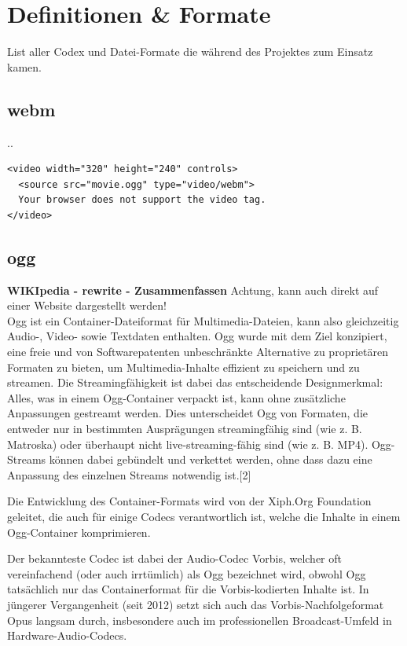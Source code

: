 \section{Definitionen \& Formate}
List aller Codex und Datei-Formate die während des Projektes zum Einsatz kamen.

\subsection{webm}
..

\begin{verbatim}
<video width="320" height="240" controls>
  <source src="movie.ogg" type="video/webm">
  Your browser does not support the video tag.
</video> 
\end{verbatim}

\subsection{ogg}

\textbf{WIKIpedia - rewrite - Zusammenfassen}
Achtung, kann auch direkt auf einer Website dargestellt werden!\\

Ogg ist ein Container-Dateiformat für Multimedia-Dateien, kann also gleichzeitig Audio-, Video- sowie Textdaten enthalten. Ogg wurde mit dem Ziel konzipiert, eine freie und von Softwarepatenten unbeschränkte Alternative zu proprietären Formaten zu bieten, um Multimedia-Inhalte effizient zu speichern und zu streamen. Die Streamingfähigkeit ist dabei das entscheidende Designmerkmal: Alles, was in einem Ogg-Container verpackt ist, kann ohne zusätzliche Anpassungen gestreamt werden. Dies unterscheidet Ogg von Formaten, die entweder nur in bestimmten Ausprägungen streamingfähig sind (wie z. B. Matroska) oder überhaupt nicht live-streaming-fähig sind (wie z. B. MP4). Ogg-Streams können dabei gebündelt und verkettet werden, ohne dass dazu eine Anpassung des einzelnen Streams notwendig ist.[2]

Die Entwicklung des Container-Formats wird von der Xiph.Org Foundation geleitet, die auch für einige Codecs verantwortlich ist, welche die Inhalte in einem Ogg-Container komprimieren.

Der bekannteste Codec ist dabei der Audio-Codec Vorbis, welcher oft vereinfachend (oder auch irrtümlich) als Ogg bezeichnet wird, obwohl Ogg tatsächlich nur das Containerformat für die Vorbis-kodierten Inhalte ist. In jüngerer Vergangenheit (seit 2012) setzt sich auch das Vorbis-Nachfolgeformat Opus langsam durch, insbesondere auch im professionellen Broadcast-Umfeld in Hardware-Audio-Codecs. 


